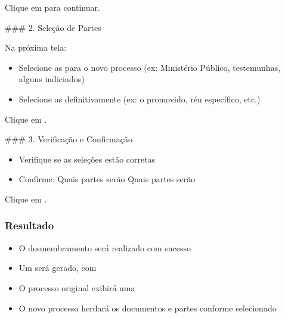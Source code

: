 \documentclass[letterpaper,10pt,brazil]{sphinxmanual}
\begin{document}
\sphinxAtStartPar
Clique em  para continuar.

\sphinxAtStartPar
\#\#\# 2. Seleção de Partes

\sphinxAtStartPar
Na próxima tela:
\begin{itemize}
\item {} 
\sphinxAtStartPar
Selecione as  para o novo processo
(ex: Ministério Público, testemunhas, alguns indiciados)

\item {} 
\sphinxAtStartPar
Selecione as  definitivamente
(ex: o promovido, réu específico, etc.)

\end{itemize}

\sphinxAtStartPar
Clique em .

\sphinxAtStartPar
\#\#\# 3. Verificação e Confirmação
\begin{itemize}
\item {} 
\sphinxAtStartPar
Verifique se as seleções estão corretas

\item {} 
\sphinxAtStartPar
Confirme:
\sphinxhyphen{} Quais partes serão 
\sphinxhyphen{} Quais partes serão 

\end{itemize}

\sphinxAtStartPar
Clique em .


\subsubsection{Resultado}
\label{\detokenize{projud_27_desmembramentoprocesso:resultado}}\begin{itemize}
\item {} 
\sphinxAtStartPar
O desmembramento será realizado com sucesso

\item {} 
\sphinxAtStartPar
Um  será gerado, com 

\item {} 
\sphinxAtStartPar
O processo original exibirá uma 

\item {} 
\sphinxAtStartPar
O novo processo herdará os documentos e partes conforme selecionado

\end{itemize}
\end{document}

